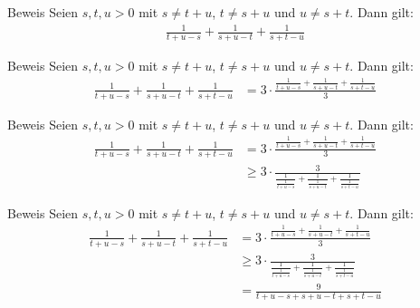 \documentclass[10pt]{beamer}
\begin{document}
\begin{frame}{Beweis}
    Seien \( s, t, u > 0 \) mit \( s \neq t + u \), \( t \neq s+ u \) und \( u \neq s + t \). Dann gilt:
    \begin{align*}
        \frac{1}{t + u - s} + \frac{1}{s + u - t} + \frac{1}{s + t - u}
    \end{align*}
\end{frame}



\begin{frame}{Beweis}
    Seien \( s, t, u > 0 \) mit \( s \neq t + u \), \( t \neq s+ u \) und \( u \neq s + t \). Dann gilt:
    \begin{align*}
        \frac{1}{t + u - s} + \frac{1}{s + u - t} + \frac{1}{s + t - u}
        & = 3 \cdot \frac{\frac{1}{t + u - s} + \frac{1}{s + u - t} + \frac{1}{s + t - u}}{3}
    \end{align*}
\end{frame}



\begin{frame}{Beweis}
    Seien \( s, t, u > 0 \) mit \( s \neq t + u \), \( t \neq s+ u \) und \( u \neq s + t \). Dann gilt:
    \begin{align*}
        \frac{1}{t + u - s} + \frac{1}{s + u - t} + \frac{1}{s + t - u}
        & = 3 \cdot \frac{\frac{1}{t + u - s} + \frac{1}{s + u - t} + \frac{1}{s + t - u}}{3} \\
        & \geq 3 \cdot \frac{3}{\frac{1}{\frac{1}{t + u - s}} + \frac{1}{\frac{1}{s + u - t}} + \frac{1}{\frac{1}{s + t - u}}}
    \end{align*}
\end{frame}



\begin{frame}{Beweis}
    Seien \( s, t, u > 0 \) mit \( s \neq t + u \), \( t \neq s+ u \) und \( u \neq s + t \). Dann gilt:
    \begin{align*}
        \frac{1}{t + u - s} + \frac{1}{s + u - t} + \frac{1}{s + t - u}
        & = 3 \cdot \frac{\frac{1}{t + u - s} + \frac{1}{s + u - t} + \frac{1}{s + t - u}}{3} \\
        & \geq 3 \cdot \frac{3}{\frac{1}{\frac{1}{t + u - s}} + \frac{1}{\frac{1}{s + u - t}} + \frac{1}{\frac{1}{s + t - u}}} \\
        & = \frac{9}{t + u - s + s + u - t + s + t - u}
    \end{align*}
\end{frame}
\end{document}

